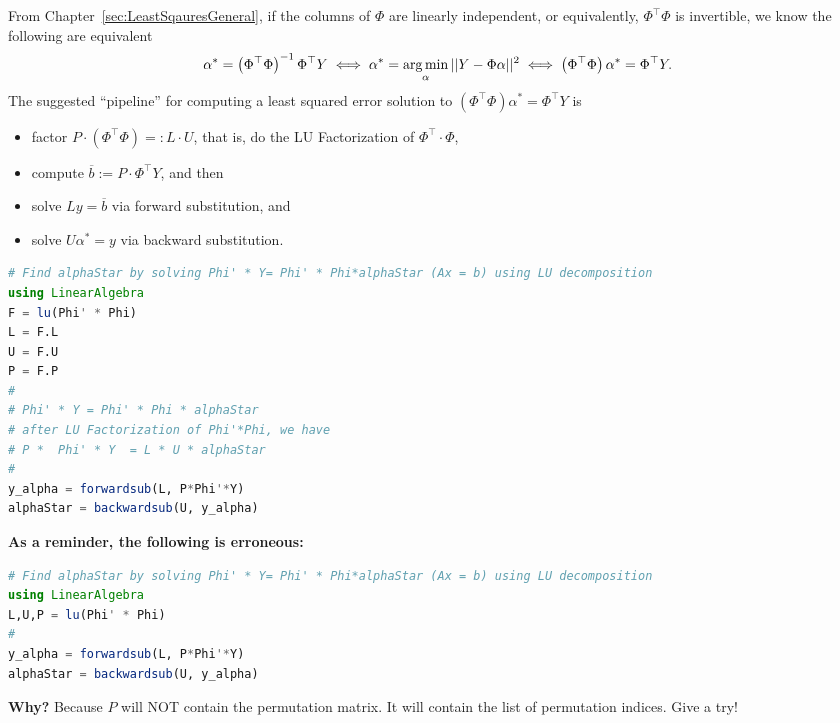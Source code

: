 \Qed

\begin{tcolorbox}[sharp corners, colback=green!30, colframe=green!80!blue, title=\textbf{\Large Large Scale Least Squares via the LU Factorization}]
 From Chapter~\ref{sec:LeastSqauresGeneral}, if the columns of $\Phi$ are linearly independent, or equivalently, $\Phi^\top \Phi$ is invertible, we know the following are equivalent 
  \begin{equation}
    \label{eq:ThmLeastSqaredErrorSolution2secondTime}
  \alpha^\ast = \left( \Phi^\top \Phi \right)^{-1}\Phi^\top Y  \iff  \alpha^\ast = \operatorname*{arg\,min}_{\alpha} ||Y-\Phi \alpha ||^2 \iff \left( \Phi^\top \Phi \right) \alpha^\ast = \Phi^\top Y.
\end{equation}
The suggested ``pipeline'' for  computing a least squared error solution to $ \left( \Phi^\top \Phi \right) \alpha^\ast = \Phi^\top Y$ is 
\begin{itemize}
    \item factor $P \cdot \left( \Phi^\top \Phi \right)  =: L \cdot U$, that is, do the LU Factorization of $\Phi^\top \cdot \Phi$,
    \item compute $\overline{b}:= P \cdot \Phi^\top Y$, and then 
    \item solve $L y = \overline{b}$ via forward substitution, and
    \item solve $U \alpha^\ast =y$ via backward substitution.
\end{itemize}
\end{tcolorbox}

\begin{tcolorbox}[title={\bf Reminder on Calling LU Correctly in Julia}]
\begin{lstlisting}[language=Julia]
# Find alphaStar by solving Phi' * Y= Phi' * Phi*alphaStar (Ax = b) using LU decomposition
using LinearAlgebra
F = lu(Phi' * Phi)
L = F.L
U = F.U
P = F.P
#
# Phi' * Y = Phi' * Phi * alphaStar
# after LU Factorization of Phi'*Phi, we have
# P *  Phi' * Y  = L * U * alphaStar
# 
y_alpha = forwardsub(L, P*Phi'*Y)
alphaStar = backwardsub(U, y_alpha)
\end{lstlisting}
\vspace*{.2cm}
\textbf{As a reminder, the following is erroneous:}
\vspace*{.2cm}
\begin{lstlisting}[language=Julia]
# Find alphaStar by solving Phi' * Y= Phi' * Phi*alphaStar (Ax = b) using LU decomposition
using LinearAlgebra
L,U,P = lu(Phi' * Phi)
#
y_alpha = forwardsub(L, P*Phi'*Y)
alphaStar = backwardsub(U, y_alpha)
\end{lstlisting}
\textbf{Why?} Because $P$ will NOT contain the permutation matrix. It will contain the list of permutation indices. Give a try!
\end{tcolorbox}


